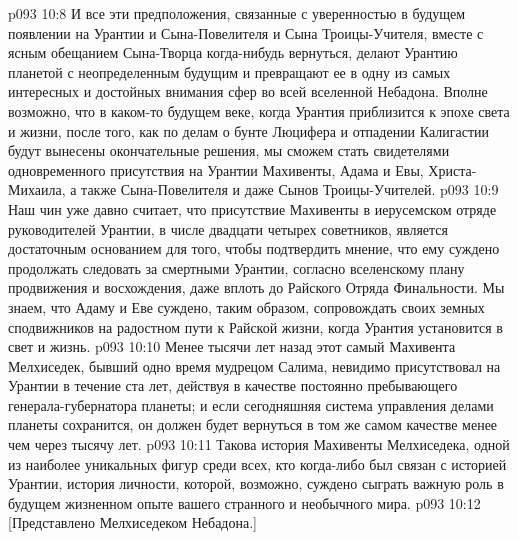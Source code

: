 \vs p093 10:8 И все эти предположения, связанные с уверенностью в будущем появлении на Урантии и Сына\hyp{}Повелителя и Сына Троицы\hyp{}Учителя, вместе с ясным обещанием Сына\hyp{}Творца когда\hyp{}нибудь вернуться, делают Урантию планетой с неопределенным будущим и превращают ее в одну из самых интересных и достойных внимания сфер во всей вселенной Небадона. Вполне возможно, что в каком\hyp{}то будущем веке, когда Урантия приблизится к эпохе света и жизни, после того, как по делам о бунте Люцифера и отпадении Калигастии будут вынесены окончательные решения, мы сможем стать свидетелями одновременного присутствия на Урантии Махивенты, Адама и Евы, Христа\hyp{}Михаила, а также Сына\hyp{}Повелителя и даже Сынов Троицы\hyp{}Учителей.
\vs p093 10:9 Наш чин уже давно считает, что присутствие Махивенты в иерусемском отряде руководителей Урантии, в числе двадцати четырех советников, является достаточным основанием для того, чтобы подтвердить мнение, что ему суждено продолжать следовать за смертными Урантии, согласно вселенскому плану продвижения и восхождения, даже вплоть до Райского Отряда Финальности. Мы знаем, что Адаму и Еве суждено, таким образом, сопровождать своих земных сподвижников на радостном пути к Райской жизни, когда Урантия установится в свет и жизнь.
\vs p093 10:10 Менее тысячи лет назад этот самый Махивента Мелхиседек, бывший одно время мудрецом Салима, невидимо присутствовал на Урантии в течение ста лет, действуя в качестве постоянно пребывающего генерала\hyp{}губернатора планеты; и если сегодняшняя система управления делами планеты сохранится, он должен будет вернуться в том же самом качестве менее чем через тысячу лет.
\vs p093 10:11 \pc Такова история Махивенты Мелхиседека, одной из наиболее уникальных фигур среди всех, кто когда\hyp{}либо был связан с историей Урантии, история личности, которой, возможно, суждено сыграть важную роль в будущем жизненном опыте вашего странного и необычного мира.
\vsetoff
\vs p093 10:12 [Представлено Мелхиседеком Небадона.]
